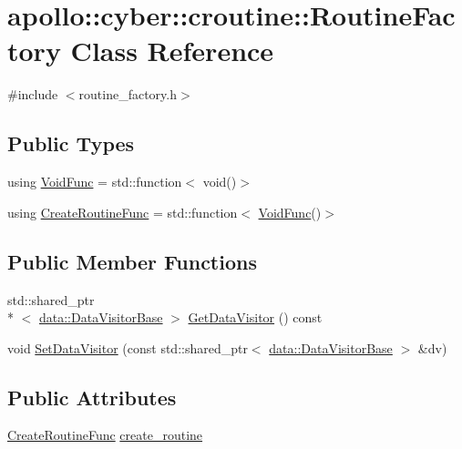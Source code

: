 \hypertarget{classapollo_1_1cyber_1_1croutine_1_1RoutineFactory}{\section{apollo\-:\-:cyber\-:\-:croutine\-:\-:Routine\-Factory Class Reference}
\label{classapollo_1_1cyber_1_1croutine_1_1RoutineFactory}
}


{\ttfamily \#include $<$routine\-\_\-factory.\-h$>$}

\subsection*{Public Types}
\begin{DoxyCompactItemize}
\item 
using \hyperlink{classapollo_1_1cyber_1_1croutine_1_1RoutineFactory_af7b761ecd3b4662358e3ec7f6d4b7135}{Void\-Func} = std\-::function$<$ void()$>$
\item 
using \hyperlink{classapollo_1_1cyber_1_1croutine_1_1RoutineFactory_abfe1cf41976441cf3c6189cbc5836b6f}{Create\-Routine\-Func} = std\-::function$<$ \hyperlink{classapollo_1_1cyber_1_1croutine_1_1RoutineFactory_af7b761ecd3b4662358e3ec7f6d4b7135}{Void\-Func}()$>$
\end{DoxyCompactItemize}
\subsection*{Public Member Functions}
\begin{DoxyCompactItemize}
\item 
std\-::shared\-\_\-ptr\\*
$<$ \hyperlink{classapollo_1_1cyber_1_1data_1_1DataVisitorBase}{data\-::\-Data\-Visitor\-Base} $>$ \hyperlink{classapollo_1_1cyber_1_1croutine_1_1RoutineFactory_a81440046cde8d0aedd196ca6d4faf56f}{Get\-Data\-Visitor} () const 
\item 
void \hyperlink{classapollo_1_1cyber_1_1croutine_1_1RoutineFactory_ad943df9a63175d9f88f3d231eb4e89d1}{Set\-Data\-Visitor} (const std\-::shared\-\_\-ptr$<$ \hyperlink{classapollo_1_1cyber_1_1data_1_1DataVisitorBase}{data\-::\-Data\-Visitor\-Base} $>$ \&dv)
\end{DoxyCompactItemize}
\subsection*{Public Attributes}
\begin{DoxyCompactItemize}
\item 
\hyperlink{classapollo_1_1cyber_1_1croutine_1_1RoutineFactory_abfe1cf41976441cf3c6189cbc5836b6f}{Create\-Routine\-Func} \hyperlink{classapollo_1_1cyber_1_1croutine_1_1RoutineFactory_a24a0cf1b6bd5edc79ebced27447a976a}{create\-\_\-routine}
\end{DoxyCompactItemize}
